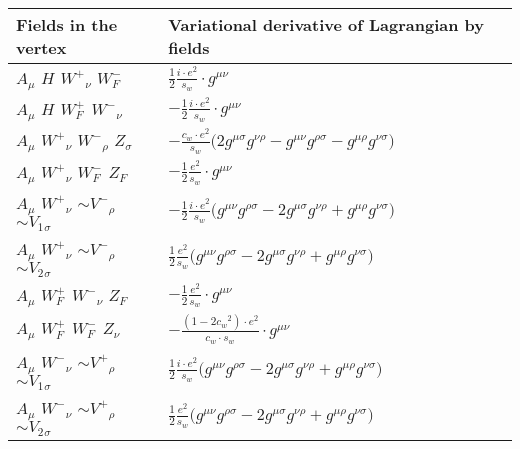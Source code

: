 \begin{center}
\begin{tabular}{|l|l|} \hline
Fields in the vertex & Variational derivative of Lagrangian by fields \\ \hline
${A}_{\mu }$ \phantom{-} ${H}_{}$ \phantom{-} $W^+{}_{\nu }$ \phantom{-} $W^-_F{}_{}$ \phantom{-}  &
	$\frac{1}{2}\frac{ i \cdot e{}^2 }{ s_w}\cdot g^{\mu \nu} $\\[2mm]
${A}_{\mu }$ \phantom{-} ${H}_{}$ \phantom{-} $W^+_F{}_{}$ \phantom{-} $W^-{}_{\nu }$ \phantom{-}  &
	$-\frac{1}{2}\frac{ i \cdot e{}^2 }{ s_w}\cdot g^{\mu \nu} $\\[2mm]
${A}_{\mu }$ \phantom{-} $W^+{}_{\nu }$ \phantom{-} $W^-{}_{\rho }$ \phantom{-} ${Z}_{\sigma }$ \phantom{-}  &
	$-\frac{ c_w \cdot e{}^2 }{ s_w}\big(2g^{\mu \sigma} g^{\nu \rho} -g^{\mu \nu} g^{\rho \sigma} -g^{\mu \rho} g^{\nu \sigma} \big)$\\[2mm]
${A}_{\mu }$ \phantom{-} $W^+{}_{\nu }$ \phantom{-} $W^-_F{}_{}$ \phantom{-} $Z_F{}_{}$ \phantom{-}  &
	$-\frac{1}{2}\frac{ e{}^2 }{ s_w}\cdot g^{\mu \nu} $\\[2mm]
${A}_{\mu }$ \phantom{-} $W^+{}_{\nu }$ \phantom{-} $\sim V^-{}_{\rho }$ \phantom{-} $\sim V_1{}_{\sigma }$ \phantom{-}  &
	$-\frac{1}{2}\frac{ i \cdot e{}^2 }{ s_w}\big(g^{\mu \nu} g^{\rho \sigma} -2g^{\mu \sigma} g^{\nu \rho} +g^{\mu \rho} g^{\nu \sigma} \big)$\\[2mm]
${A}_{\mu }$ \phantom{-} $W^+{}_{\nu }$ \phantom{-} $\sim V^-{}_{\rho }$ \phantom{-} $\sim V_2{}_{\sigma }$ \phantom{-}  &
	$\frac{1}{2}\frac{ e{}^2 }{ s_w}\big(g^{\mu \nu} g^{\rho \sigma} -2g^{\mu \sigma} g^{\nu \rho} +g^{\mu \rho} g^{\nu \sigma} \big)$\\[2mm]
${A}_{\mu }$ \phantom{-} $W^+_F{}_{}$ \phantom{-} $W^-{}_{\nu }$ \phantom{-} $Z_F{}_{}$ \phantom{-}  &
	$-\frac{1}{2}\frac{ e{}^2 }{ s_w}\cdot g^{\mu \nu} $\\[2mm]
${A}_{\mu }$ \phantom{-} $W^+_F{}_{}$ \phantom{-} $W^-_F{}_{}$ \phantom{-} ${Z}_{\nu }$ \phantom{-}  &
	$-\frac{ (1-2 c_w {}^2) \cdot e{}^2 }{ c_w \cdot s_w}\cdot g^{\mu \nu} $\\[2mm]
${A}_{\mu }$ \phantom{-} $W^-{}_{\nu }$ \phantom{-} $\sim V^+{}_{\rho }$ \phantom{-} $\sim V_1{}_{\sigma }$ \phantom{-}  &
	$\frac{1}{2}\frac{ i \cdot e{}^2 }{ s_w}\big(g^{\mu \nu} g^{\rho \sigma} -2g^{\mu \sigma} g^{\nu \rho} +g^{\mu \rho} g^{\nu \sigma} \big)$\\[2mm]
${A}_{\mu }$ \phantom{-} $W^-{}_{\nu }$ \phantom{-} $\sim V^+{}_{\rho }$ \phantom{-} $\sim V_2{}_{\sigma }$ \phantom{-}  &
	$\frac{1}{2}\frac{ e{}^2 }{ s_w}\big(g^{\mu \nu} g^{\rho \sigma} -2g^{\mu \sigma} g^{\nu \rho} +g^{\mu \rho} g^{\nu \sigma} \big)$\\[2mm]

\end{tabular}
\end{center}
